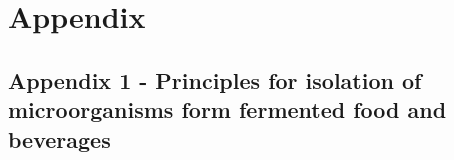 \chapter{Appendix}
\section{Appendix 1 - Principles for isolation of microorganisms form fermented food and beverages}
\label{appendix1}
%
